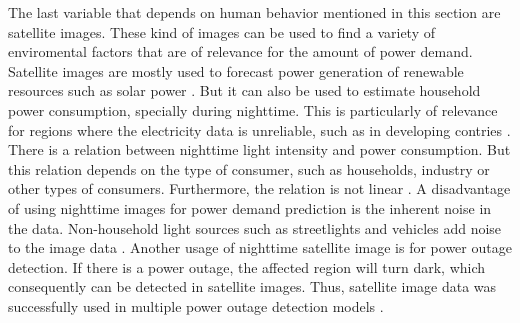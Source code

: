 The last variable that depends on human behavior mentioned in this section are
satellite images. These kind of images can be used to find a variety 
of enviromental factors that are of relevance for the amount of power demand.
Satellite images are mostly used to forecast power generation of 
renewable resources such as solar power \cite{solarprediction}.
But it can also be used to estimate household power consumption,
specially during nighttime. This is particularly of relevance for regions 
where the electricity data is unreliable, such as in developing contries
\cite{reviewnighttime}. There is a relation 
between nighttime light intensity and power consumption.
But this relation depends on the type of consumer, such as households, industry
or other types of consumers. Furthermore, the relation is not linear
\cite{nighttimepowerestimation}. 
A disadvantage of using nighttime images for power demand prediction is 
the inherent noise in the data. Non-household light sources such as 
streetlights and vehicles add noise to the image data \cite{reviewnighttime}.
Another usage of nighttime satellite image is for power outage detection.
If there is a power outage, the affected region will turn dark, which 
consequently can be detected in satellite images. Thus, satellite image data 
was successfully used in multiple power outage detection models
\cite{nightpoweroutage} \cite{twitterpoweroutagelighttime}.